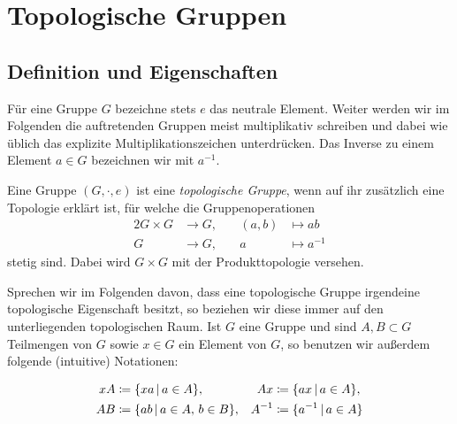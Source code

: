 \chapter{Topologische Gruppen}
\section{Definition und Eigenschaften}
Für eine Gruppe $G$ bezeichne stets $e$ das neutrale Element. Weiter werden wir
im Folgenden die auftretenden Gruppen meist multiplikativ schreiben und dabei
wie üblich das explizite Multiplikationszeichen unterdrücken. Das Inverse zu
einem Element $a\in G$ bezeichnen wir mit $a^{-1}$.

\begin{thDef}
    Eine Gruppe $(G,\cdot, e)$ ist eine \emph{topologische Gruppe}, wenn auf ihr
    zusätzlich eine Topologie erklärt ist, für welche die Gruppenoperationen
    \begin{alignat*}{2}
        G \times G &\to G,  &\quad (a,b) &\mapsto ab
        \\
        G &\to G,           &\quad     a &\mapsto a^{-1}
    \end{alignat*}
    stetig sind. Dabei wird $G\times G$ mit der Produkttopologie versehen.
\end{thDef}

Sprechen wir im Folgenden davon, dass eine topologische Gruppe irgendeine
topologische Eigenschaft besitzt, so beziehen wir diese immer auf den
unterliegenden topologischen Raum.
Ist $G$ eine Gruppe und sind $A,B\subset G$ Teilmengen von $G$ sowie $x\in G$
ein Element von $G$, so benutzen wir außerdem folgende (intuitive) Notationen:
\begin{thNotation} 
    \begin{align*}
        xA &\defeq \{ xa \Mid a\in A \},            &
        Ax &\defeq \{ ax \Mid a\in A \},            \\
        AB &\defeq \{ ab \Mid a\in A,\, b\in B \},  &
        A^{-1} &\defeq \{ a^{-1} \Mid a\in A \}     %
    \end{align*}
\end{thNotation}

